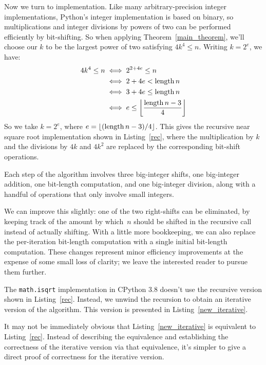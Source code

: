\documentclass[a4paper]{article}
\DeclarePairedDelimiter\floor{\lfloor}{\rfloor}
\DeclareMathOperator{\length}{length}
\theoremstyle{plain}
\theoremstyle{definition}
\begin{document}
Now we turn to implementation. Like many arbitrary-precision integer
implementations, Python's integer implementation is based on binary, so
multiplications and integer divisions by powers of two can be performed
efficiently by bit-shifting. So when applying Theorem~\ref{main_theorem}, we'll
choose our $k$ to be the largest power of two satisfying $4k^4 \le n$. Writing
$k=2^e$, we have:
\begin{align*}
  4k^4 \le n
  &\iff 2^{2 + 4e} \le n \\
  &\iff 2 + 4e < \length n \\
  &\iff 3 + 4e \le \length n \\
  &\iff e \le \floor*{\frac{\length n - 3}{4}}
\end{align*}
So we take $k = 2^e$, where $e={\floor{(\length n - 3)/4}}$. This gives the recursive
near square root implementation shown in Listing~\ref{rec}, where the
multiplication by $k$ and the divisions by $4k$ and $4k^2$ are replaced by the
corresponding bit-shift operations.



Each step of the algorithm involves three big-integer shifts, one
big-integer addition, one bit-length computation, and one big-integer division,
along with a handful of operations that only involve small integers.

We can improve this slightly: one of the two right-shifts can be eliminated, by
keeping track of the amount by which~$n$ should be shifted in the recursive
call instead of actually shifting. With a little more bookkeeping, we can
also replace the per-iteration bit-length computation with a single
initial bit-length computation. These changes represent minor efficiency
improvements at the expense of some small loss of clarity; we leave the
interested reader to pursue them further.

The \lstinline{math.isqrt} implementation in CPython 3.8 doesn't use the
recursive version shown in Listing~\ref{rec}. Instead, we unwind the recursion
to obtain an iterative version of the algorithm. This version is presented in
Listing~\ref{new_iterative}.



It may not be immediately obvious that Listing~\ref{new_iterative} is
equivalent to Listing~\ref{rec}. Instead of describing the equivalence and
establishing the correctness of the iterative version via that equivalence,
it's simpler to give a direct proof of correctness for the iterative version.
\end{document}
